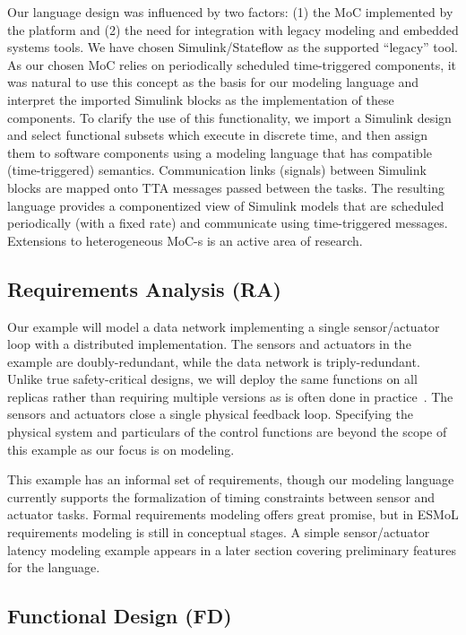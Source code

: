 Our language design was influenced by two factors: (1) the MoC implemented by the platform and (2) the need for integration with legacy modeling and embedded systems tools. We have chosen Simulink/Stateflow as the supported ``legacy'' tool. As our chosen MoC relies on periodically scheduled time-triggered components, it was natural to use this concept as the basis for our modeling language and interpret the imported Simulink blocks as the implementation of these components. To clarify the use of this functionality, we import a Simulink design and select functional subsets which execute in discrete time, and then assign them to software components using a modeling language that has compatible (time-triggered) semantics. Communication links (signals) between Simulink blocks are mapped onto TTA messages passed between the tasks. The resulting language provides a componentized view of Simulink models that are scheduled periodically (with a fixed rate) and communicate using time-triggered messages.  Extensions to heterogeneous MoC-s is an active area of research.

\subsection{Requirements Analysis (RA)}

Our example will model a data network implementing a single sensor/actuator loop with a distributed implementation.  The sensors and actuators in the example are doubly-redundant, while the data network is triply-redundant.  Unlike true safety-critical designs, we will deploy the same functions on all replicas rather than requiring multiple versions as is often done in practice~\cite{DO178B}.  The sensors and actuators close a single physical feedback loop.  Specifying the physical system and particulars of the control functions are beyond the scope of this example as our focus is on modeling.

This example has an informal set of requirements, though our modeling language currently supports the formalization of timing constraints between sensor and actuator tasks.  Formal requirements modeling offers great promise, but in ESMoL requirements modeling is still in conceptual stages.  A simple sensor/actuator latency modeling example appears in a later section covering preliminary features for the language.

\subsection{Functional Design (FD)}

